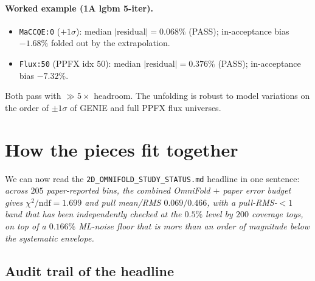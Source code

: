 \documentclass[12pt]{article}
\begin{document}
\paragraph{Worked example (1A lgbm 5-iter).}
\begin{itemize}[nosep]
  \item \texttt{MaCCQE:0} ($+1\sigma$): median $|\text{residual}|=\boxed{0.068\%}$ (PASS);
        in-acceptance bias $-1.68\%$ folded out by the extrapolation.
  \item \texttt{Flux:50} (PPFX idx $50$): median $|\text{residual}|=
        \boxed{0.376\%}$ (PASS); in-acceptance bias $-7.32\%$.
\end{itemize}
Both pass with $\gg 5\times$ headroom. The unfolding is robust to
model variations on the order of $\pm 1\sigma$ of GENIE and full PPFX
flux universes.

\section{How the pieces fit together}
\label{sec:assemble}

We can now read the \texttt{2D\_OMNIFOLD\_STUDY\_STATUS.md} headline
in one sentence: \emph{across $205$ paper-reported bins, the
combined OmniFold $+$ paper error budget gives $\chi^{2}/\mathrm{ndf} =
1.699$ and pull mean/RMS $0.069/0.466$, with a pull-RMS-$<1$ band
that has been independently checked at the $0.5\%$ level by $200$
coverage toys, on top of a $0.166\%$ ML-noise floor that is more than
an order of magnitude below the systematic envelope.}

\subsection*{Audit trail of the headline}
\end{document}
